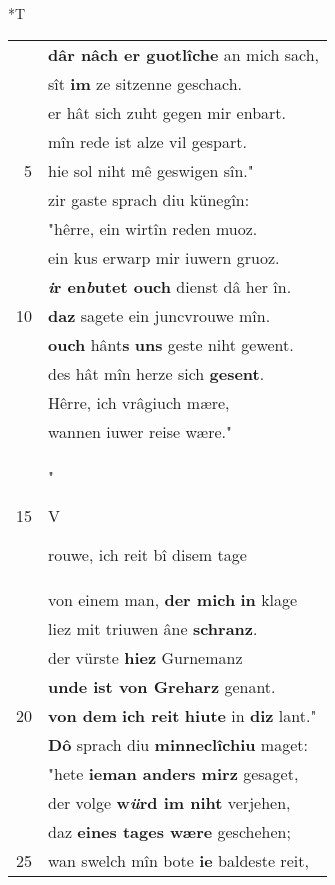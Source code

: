 \documentclass[8pt,a4paper,notitlepage]{article}
\begin{document}
\begin{table}[ht]
\begin{minipage}[t]{0.5\linewidth}
\end{minipage}
\hspace{0.5cm}
\begin{minipage}[t]{0.5\linewidth}
\small
\begin{center}*T
\end{center}
\begin{tabular}{rl}
 & \textbf{dâr nâch er guotlîche} an mich sach,\\ 
 & sît \textbf{im} ze sitzenne geschach.\\ 
 & er hât sich zuht gegen mir enbart.\\ 
 & mîn rede ist alze vil gespart.\\ 
5 & hie sol niht mê geswigen sîn."\\ 
 & zir gaste sprach diu künegîn:\\ 
 & "hêrre, ein wirtîn reden muoz.\\ 
 & ein kus erwarp mir iuwern gruoz.\\ 
 & \textbf{\textit{i}r en\textit{b}utet ouch} dienst dâ her în.\\ 
10 & \textbf{daz} sagete ein juncvrouwe mîn.\\ 
 & \textbf{ouch} hânt\textbf{s} \textbf{uns} geste niht gewent.\\ 
 & des hât mîn herze sich \textbf{gesent}.\\ 
 & Hêrre, ich vrâgiuch mære,\\ 
 & wannen iuwer reise wære."\\ 
15 & "\begin{large}V\end{large}rouwe, ich reit bî disem tage\\ 
 & von einem man, \textbf{der mich} \textbf{in} klage\\ 
 & liez mit triuwen âne \textbf{schranz}.\\ 
 & der vürste \textbf{hiez} Gurnemanz\\ 
 & \textbf{unde ist von Greharz} genant.\\ 
20 & \textbf{von dem} \textbf{ich reit} \textbf{hiute} in \textbf{diz} lant."\\ 
 & \textbf{Dô} sprach diu \textbf{minneclîchiu} maget:\\ 
 & "hete \textbf{ieman anders mirz} gesaget,\\ 
 & der volge \textbf{w\textit{ü}rd im niht} verjehen,\\ 
 & daz \textbf{eines tages wære} geschehen;\\ 
25 & wan swelch mîn bote \textbf{ie} baldeste reit,\\ 

\end{tabular}
\end{minipage}
\end{table}
\end{document}
